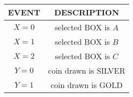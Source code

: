 \begin{tabular}{|c|c|}
\hline
 \textbf{EVENT} & \textbf{DESCRIPTION}\\
\hline
 $X = 0$ & selected BOX is $A$  \\
\hline
 $X = 1$ & selected BOX is $B$\\
\hline
 $X = 2$ & selected BOX is $C$\\
\hline
 $Y = 0$ & coin drawn is SILVER\\
 \hline
 $Y = 1$ & coin drawn is GOLD\\
 \hline
\end{tabular}\\
